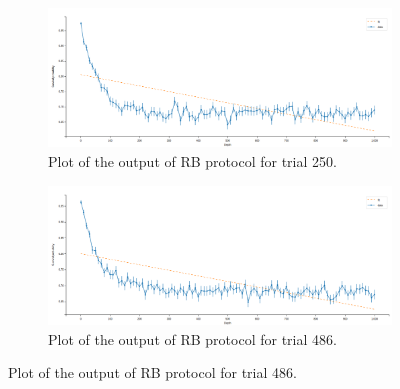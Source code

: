 \begin{figure}[h!]
    \centering
    \begin{subfigure}[t]{0.45\textwidth}
        \includegraphics[width=\textwidth]{figures/png/RB_optimization/Optuna/1000beta/failed1.png}
        \caption{Plot of the output of RB protocol for trial 250.}
        \label{fig:optuna1000beta:failed1}
    \end{subfigure}
    \hfill
    \begin{subfigure}[t]{0.45\textwidth}
        \includegraphics[width=\textwidth]{figures/png/RB_optimization/Optuna/1000beta/failed2.png}
        \caption{Plot of the output of RB protocol for trial 486.}
        \label{fig:optuna1000beta:failed2}
    \end{subfigure}

    \vspace{0.5cm}


\end{figure}
